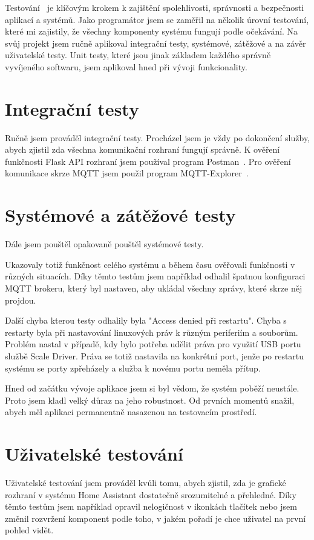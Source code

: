 Testování~\cite{testovacipyramida} je klíčovým krokem k zajištění spolehlivosti, správnosti a bezpečnosti aplikací a systémů.
Jako programátor jsem se zaměřil na několik úrovní testování, které mi zajistily, že všechny komponenty systému fungují podle očekávání.
Na svůj projekt jsem ručně aplikoval integrační testy, systémové, zátěžové a na závěr uživatelské testy.
Unit testy, které jsou jinak základem každého správně vyvíjeného softwaru, jsem aplikoval hned při vývoji funkcionality.

\section{Integrační testy}\label{sec:integracni-testy}
Ručně jsem prováděl integrační testy.
Procházel jsem je vždy po dokončení služby, abych zjistil zda všechna komunikační rozhraní fungují správně.
K ověření funkčnosti Flask API rozhraní jsem používal program Postman~\cite{PostmanExplanation}.
Pro ověření komunikace skrze MQTT jsem použil program MQTT-Explorer~\cite{MQTTExplorer}.

\section{Systémové a zátěžové testy}\label{sec:systemove-a-smoke-testy}
Dále jsem pouštěl opakovaně pouštěl systémové testy.

Ukazovaly totiž funkčnost celého systému a během času ověřovali funkčnosti v různých situacích.
Díky těmto testům jsem například odhalil špatnou konfiguraci MQTT brokeru, který byl nastaven, aby ukládal všechny zprávy, které skrze něj projdou.

Další chyba kterou testy odhalily byla "Access denied při restartu".
Chyba s restarty byla při nastavování linuxových práv k různým periferiím a souborům.
Problém nastal v případě, kdy bylo potřeba udělit práva pro využití USB portu službě Scale Driver.
Práva se totiž nastavila na konkrétní port, jenže po restartu systému se porty zpřeházely a služba k novému portu neměla přítup.

Hned od začátku vývoje aplikace jsem si byl vědom, že systém poběží neustále.
Proto jsem kladl velký důraz na jeho robustnost.
Od prvních momentů snažil, abych měl aplikaci permanentně nasazenou na testovacím prostředí.


\section{Uživatelské testování}\label{sec:uzivatelske-testovani}
Uživatelské testování jsem prováděl kvůli tomu, abych zjistil, zda je grafické rozhraní v systému Home Assistant dostatečně srozumitelné a přehledné.
Díky těmto testům jsem například opravil nelogičnost v ikonkách tlačítek nebo jsem změnil rozvržení komponent podle toho, v jakém pořadí je chce uživatel na první pohled vidět.